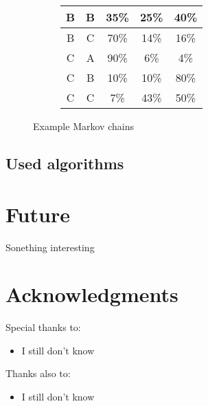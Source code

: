 \documentclass[]{article}
\begin{document}
\begin{figure}[h]
\begin{subfigure}[b]{0.4\textwidth}
\begin{tabular}{|c|c|c|c|c|}
                            B & B & 35\% & 25\% & 40\% \\ \hline
                            B & C & 70\% & 14\% & 16\% \\ \hline
                            C & A & 90\% &  6\% &  4\% \\ \hline
                            C & B & 10\% & 10\% & 80\% \\ \hline
                            C & C &  7\% & 43\% & 50\% \\ \hline
                        \end{tabular}
                    \end{subfigure}
                    \caption{Example Markov chains}
                \end{figure}
        \subsection{Used algorithms}
        \newpage
    \section{Future}
    Sonething interesting
    \section{Acknowledgments}
        \Large{Special thanks to:
            \begin{itemize}
                \item I still don't know
            \end{itemize}
        }
        \large{Thanks also to:
            \begin{itemize}
                \item I still don't know
            \end{itemize}
        }
\end{document}

